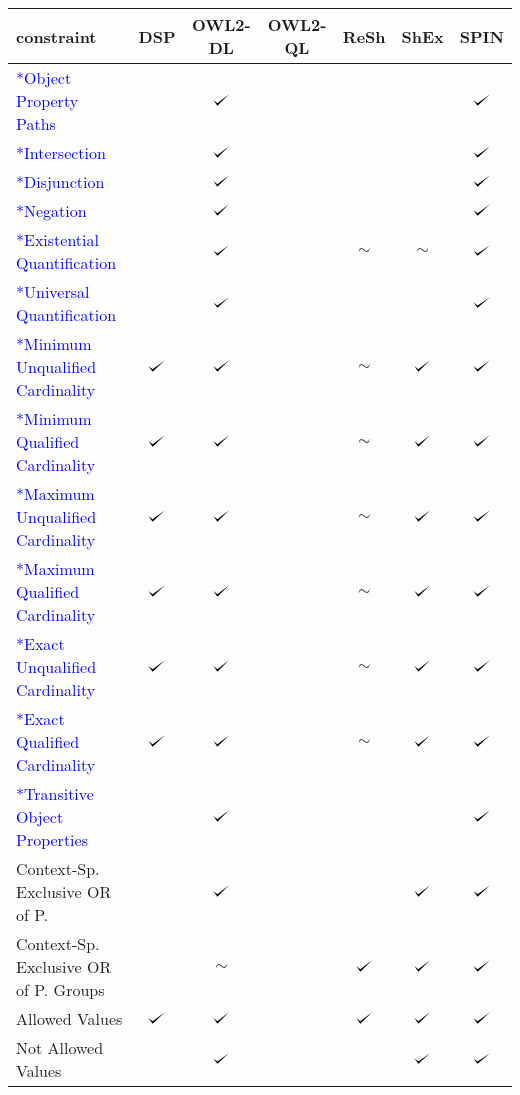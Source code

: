 \documentclass{llncs}
\def\checkmark{\tikz\fill[scale=0.4](0,.35) -- (.25,0) -- (1,.7) -- (.25,.15) -- cycle;}
\newenvironment{evaluation}{
  \scriptsize
  \sffamily
  \vspace{0.3cm}
  \begin{tabular}{l|c|c|c|c|c|c}
  \hline
  \textbf{constraint} & \textbf{DSP} & \textbf{OWL2-DL} & \textbf{OWL2-QL} & \textbf{ReSh} & \textbf{ShEx} & \textbf{SPIN} \\
  \hline

}{
  \hline
  \end{tabular}
  \linebreak
}
\begin{document}
\begin{evaluation}
\textcolor{blue}{*Object Property Paths} & \ding{55} & $\checkmark$ & \ding{55} & \ding{55} & \ding{55} & $\checkmark$ \\
\textcolor{blue}{*Intersection} & \ding{55} & $\checkmark$ & \ding{55} & & & $\checkmark$ \\
\textcolor{blue}{*Disjunction} & \ding{55} & $\checkmark$ & \ding{55} & & & $\checkmark$ \\
\textcolor{blue}{*Negation} & \ding{55} & $\checkmark$ & \ding{55} & & & $\checkmark$ \\
\textcolor{blue}{*Existential Quantification} & \ding{55} & $\checkmark$ & \ding{55} & $\sim$ & $\sim$ & $\checkmark$ \\
\textcolor{blue}{*Universal Quantification} & \ding{55} & $\checkmark$ & \ding{55} & & & $\checkmark$ \\
\textcolor{blue}{*Minimum Unqualified Cardinality} & $\checkmark$ & $\checkmark$ & \ding{55} & $\sim$ & $\checkmark$ & $\checkmark$ \\
\textcolor{blue}{*Minimum Qualified Cardinality} & $\checkmark$ & $\checkmark$ & \ding{55} & $\sim$ & $\checkmark$ & $\checkmark$ \\
\textcolor{blue}{*Maximum Unqualified Cardinality} & $\checkmark$ & $\checkmark$ & \ding{55} & $\sim$ & $\checkmark$ & $\checkmark$ \\
\textcolor{blue}{*Maximum Qualified Cardinality} & $\checkmark$ & $\checkmark$ & \ding{55} & $\sim$ & $\checkmark$ & $\checkmark$ \\
\textcolor{blue}{*Exact Unqualified Cardinality} & $\checkmark$ & $\checkmark$ & \ding{55} & $\sim$ & $\checkmark$ & $\checkmark$ \\
\textcolor{blue}{*Exact Qualified Cardinality} & $\checkmark$ & $\checkmark$ & \ding{55} & $\sim$ & $\checkmark$ & $\checkmark$ \\
\textcolor{blue}{*Transitive Object Properties} & \ding{55} & $\checkmark$ & \ding{55} & \ding{55} & \ding{55} & $\checkmark$ \\
Context-Sp. Exclusive OR of P. & \ding{55} & $\checkmark$ & \ding{55} & & $\checkmark$ & $\checkmark$ \\
Context-Sp. Exclusive OR of P. Groups & \ding{55} & $\sim$ & \ding{55} & $\checkmark$ & $\checkmark$ & $\checkmark$ \\
Allowed Values & $\checkmark$ & $\checkmark$ & \ding{55} & $\checkmark$ & $\checkmark$& $\checkmark$ \\
Not Allowed Values & \ding{55} & $\checkmark$ & \ding{55} & \ding{55} & $\checkmark$ & $\checkmark$ \\

\end{evaluation}
\end{document}
